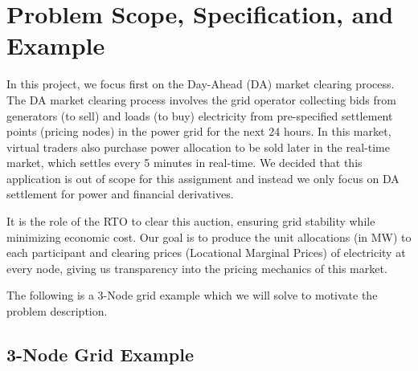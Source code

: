 \documentclass[11pt]{article}
\begin{document}
\begin{abstract}
The goal of this project is to simulate an end-to-end market clearing process for a mock electric grid, deriving electricity prices across the grid, and as an extension, clearing one auction round in the electricity derivatives market for a product called Financial Transmission Rights (FTR). We believe this application to be especially enriching to those of us exploring a career in electricity trading, as well as serving as insight into the pricing mechanics of this market in the age of surging power prices due to the rising adoption of datacenters and Artificial Intelligence.
\end{abstract}

\newpage
\tableofcontents
\newpage

\section{Problem Scope, Specification, and Example}



In this project, we focus first on the Day-Ahead (DA) market clearing process. The DA market clearing process involves the grid operator collecting bids from generators (to sell) and loads (to buy) electricity from pre-specified settlement points (pricing nodes) in the power grid for the next 24 hours. In this market, virtual traders also purchase power allocation to be sold later in the real-time market, which settles every 5 minutes in real-time. We decided that this application is out of scope for this assignment and instead we only focus on DA settlement for power and financial derivatives.

It is the role of the RTO to clear this auction, ensuring grid stability while minimizing economic cost. Our goal is to produce the unit allocations (in MW) to each participant and clearing prices (Locational Marginal Prices) of electricity at every node, giving us transparency into the pricing mechanics of this market.

The following is a 3-Node grid example which we will solve to motivate the problem description.

\subsection{3-Node Grid Example}
\begin{center}
\end{center}
\end{document}
